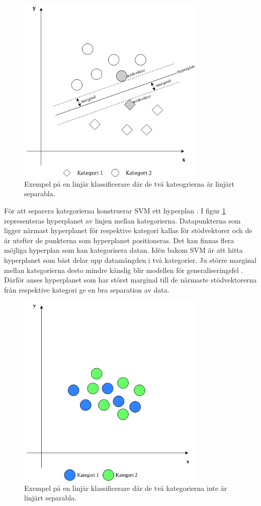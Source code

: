 \documentclass{kaumasters} %
\begin{document}
\begin{figure}[H]
\includegraphics[width=9cm]{linearsvm_hpwithmargins}
\centering
\caption{Exempel på en linjär klassificerare där de två kateogrierna är linjärt separabla.}
\label{fig:svmmarg}
\end{figure}  

För att separera kategorierna konstruerar SVM ett hyperplan \cite{svm:003}. I figur \ref{fig:svmmarg} representeras hyperplanet av linjen mellan kategorierna. Datapunkterna som ligger närmast hyperplanet för respektive kategori kallas för stödvektorer och de är utefter de punkterna som hyperplanet positioneras. Det kan finnas flera möjliga hyperplan som kan kategorisera datan. Idén bakom SVM är att hitta hyperplanet som bäst delar upp datamängden i två kategorier. Ju större marginal mellan kategorierna desto mindre känslig blir modellen för generaliseringsfel \cite{svm:002}. Därför anses hyperplanet som har störst marginal till de närmaste stödvektorerna från respektive kategori ge en bra separation av data.

\begin{figure}[H]
\includegraphics[width=9cm]{nonlinearsvm}
\centering
\caption{Exempel på en linjär klassificerare där de två kategorierna inte är linjärt separabla.}
\label{fig:svmnonl}
\end{figure} 
\end{document}
